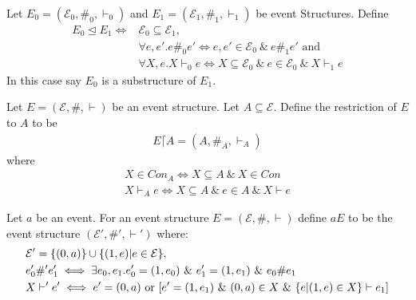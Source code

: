 \documentclass{article}
\begin{document}
\begin{definition}
    Let $E_0 = (\mathcal{E}_0,\#_0,\vdash_0)$ and $E_1 = (\mathcal{E}_1,\#_1,\vdash_1)$
    be event Structures. Define
    \begin{align*}
        E_0 \trianglelefteq E_1 \iff & \mathcal{E}_0 \subseteq \mathcal{E}_1,                                          \\
                                     & \forall e,e'. e\#_0e'  \iff e,e' \in \mathcal{E}_0 \ \& \ e\#_1 e' \text{ and } \\
                                     & \forall X,e.X\vdash_0 e  \iff X \subseteq \mathcal{E}_0
        \ \& \ e \in \mathcal{E}_0\ \& \ X \vdash_1 e
    \end{align*}
    In this case say $E_0$ is a substructure of $E_1$.
\end{definition}

\begin{definition}[Restriction]
    Let $E = (\mathcal{E},\#,\vdash)$ be an event structure.
    Let $A \subseteq \mathcal{E}$.
    Define the restriction of $E$ to $A$ to be
    \begin{align*}
        E \lceil A = (A,\#_A,\vdash_A)
    \end{align*}
    where
    \begin{align*}
        X \in Con_A \iff X \subseteq A \ \& \ X \in Con \\
        X \vdash_A e \iff X \subseteq A \ \& \ e \in A \ \& \ X \vdash e
    \end{align*}
\end{definition}

\begin{definition}
    Let $a$ be an event.
    For an event structure $E = (\mathcal{E},\#,\vdash)$ define $aE$ to be the event structure $(\mathcal{E'},\#',\vdash')$ where:
    \begin{align*}
         & \mathcal{E'} = \s{(0,a)} \cup \s{(1,e)|e \in \mathcal{E}},                                                   \\
         & e_0' \#' e_1'  \iff \exists e_0,e_1.e_0' = (1,e_0)
        \ \& \ e_1' = (1,e_1) \ \& \ e_0 \# e_1                                                                         \\
         & X \vdash' e' \iff e' = (0,a) \text{ or } [e' = (1,e_1) \ \& \ (0,a)\in X \ \& \ \s{e|(1,e)\in X} \vdash e_1]
    \end{align*}
\end{definition}
\end{document}
